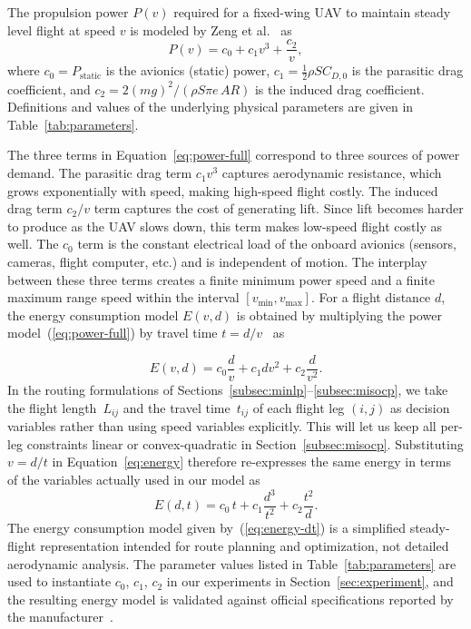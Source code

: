 \documentclass[11pt]{article}
\begin{document}
The propulsion power $P(v)$ required for a fixed-wing UAV to maintain steady level flight at speed $v$ is modeled by Zeng et al.~\cite{zeng2017energy} as
%
\begin{equation}\label{eq:power-full}
    P(v) = c_0 + c_1 v^3 + \frac{c_2}{v},
\end{equation}
%
where $c_0 = P_{\text{static}}$ is the avionics (static) power, $c_1 = \tfrac{1}{2} \rho S C_{D,0}$ is the parasitic drag coefficient, and $c_2 = 2(mg)^2/(\rho S \pi e\, AR)$ is the induced drag coefficient. Definitions and values of the underlying physical parameters are given in Table~\ref{tab:parameters}. 

The three terms in Equation~\eqref{eq:power-full} correspond to three sources of power demand. The parasitic drag term $c_1 v^3$ captures aerodynamic resistance, which grows exponentially with speed, making high-speed flight costly. The induced drag term $c_2/v$ term captures the cost of generating lift. Since lift becomes harder to produce as the UAV slows down, this term makes low-speed flight costly as well. The $c_0$ term is the constant electrical load of the onboard avionics (sensors, cameras, flight computer, etc.) and is independent of motion. The interplay between these three terms creates a finite minimum power speed and a finite maximum range speed within the interval $[v_{\min}, v_{\max}]$. For a flight distance $d$, the energy consumption model $E(v, d)$ is obtained by multiplying the power model~(\ref{eq:power-full}) by travel time $t = d/v$~\cite{zeng2017energy} as

%
\begin{equation}
    E(v, d) = c_0 \frac{d}{v} + c_1 d v^2 + c_2 \frac{d}{v^2}. \label{eq:energy}
\end{equation}
%
In the routing formulations of Sections~\ref{subsec:minlp}--\ref{subsec:misocp}, we take the flight length~$L_{ij}$ and the travel time~$t_{ij}$ of each flight leg $(i,j)$ as decision variables rather than using speed variables explicitly. This will let us keep all per-leg constraints linear or convex-quadratic in Section~\ref{subsec:misocp}. Substituting $v = d/t$ in Equation~\eqref{eq:energy} therefore re-expresses the same energy in terms of the variables actually used in our model as 
%
\begin{equation}\label{eq:energy-dt}
    E(d, t) = c_0\, t + c_1 \frac{d^3}{t^2} + c_2 \frac{t^2}{d}.
\end{equation}
%
The energy consumption model given by~(\ref{eq:energy-dt}) is a simplified steady-flight representation intended for route planning and optimization, not detailed aerodynamic analysis. The parameter values listed in Table~\ref{tab:parameters} are used to instantiate $c_0$, $c_1$, $c_2$ in our experiments in Section~\ref{sec:experiment}, and the resulting energy model is validated against official specifications reported by the manufacturer~\cite{baykar_tb2}.
\end{document}
